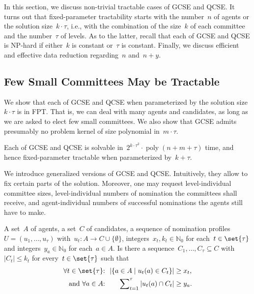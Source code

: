\documentclass[10pt,a4paper,twocolumn]{article}
\theoremstyle{plain}
\theoremstyle{definition}
\theoremstyle{remark}
\newcommand{\prob}[1]{\textnormal{\textsc{#1}}}
\newcommand{\wpb}{when parameterized by}
\newcommand{\Nzero}{\mathds{N}_0}
\newcommand{\cocl}[1]{\textrm{#1}}
\newcommand{\FPT}{\cocl{FPT}}
\newcommand{\fpt}{fixed-parameter tractable}
\newcommand{\NP}{\cocl{NP}}
\DeclareMathOperator{\poly}{poly}
\newcommand{\smlaAcr}{\prob{GCSE}}
\newcommand{\fmlaAcr}{\prob{QCSE}}
\newcommand{\pesmlaTsc}{\prob{Pre-Elected \smlaAcr}}
\newcommand{\pesmlaAcr}{\prob{PE-\smlaAcr}}
\begin{document}
{In this section,
we discuss non-trivial tractable cases of \smlaAcr{} and \fmlaAcr{}.
It turns out that fixed-parameter tractability starts with
the number~$n$ of agents or
the solution size~$k\cdot \tau$,
i.e.,
with the combination of the size~$k$ of each committee and the number~$\tau$ of levels.
As to the latter,
recall that each of \smlaAcr{} and \fmlaAcr{} is \NP-hard if either~$k$ is constant or~$\tau$ is constant.
Finally,
we discuss efficient and effective data reduction
regarding~$n$ and~$n+y$.

%
%
%
\subsection{Few Small Committees May be Tractable}

We show that each of \smlaAcr{} and \fmlaAcr{} 
when parameterized by the solution size~$k\cdot\tau$ 
is in \FPT{}.
That is,
we can deal with many agents and candidates,
as long as we are asked to elect few small committees.
We also show that \smlaAcr{} admits presumably
no problem kernel of size polynomial in~$m\cdot\tau$.

\begin{theorem}
  \label{thm:ktau}
 Each of \smlaAcr{} and \fmlaAcr{}
 is solvable in~$2^{k\cdot\tau^2}\cdot \poly(n+m+\tau)$ time,
%
 and hence \fpt{} \wpb{}~$k+\tau$.
\end{theorem}

\noindent
We introduce generalized versions of \smlaAcr{} and \fmlaAcr{}.
Intuitively, they allow to fix certain parts of the solution.
Moreover, one may request level-individual committee sizes,
level-individual numbers of nomination the committees shall receive,
and agent-individual numbers of successful nominations the agents
 still have to make.

\medskip
\decprob{\pesmlaTsc{} (\pesmlaAcr)}{pesmla}
{A set~$A$ of agents,
a set~$C$ of candidates,
a sequence of nomination profiles~$U=(u_1,\dots,u_\tau)$ with~$u_t\colon A\to C\cup\{\emptyset\}$,
integers~$x_t,k_t\in\Nzero$ for each~$t\in\set{\tau}$
and integers~$y_a\in\Nzero$ for each~$a\in A$.}
{Is there a sequence~$C_1,\dots,C_\tau\subseteq C$ with~$|C_t|\leq k_t$
for every~$t\in\set{\tau}$ 
such that
\begin{align}
 \text{$\forall t\in\set{\tau}$:} && \!\!|\{a\in A\mid u_t(a)\in C_t\}| &\geq x_t,
%
 \notag\\
 \text{and $\forall a\in A$:} && \sum\nolimits_{t=1}^\tau |u_t(a)\cap C_t| &\geq y_a. \label{prob:pesmla:y}
\end{align}
}
%
%
%
%
%
%
%
%
%
%
%
%
%

}
\end{document}
